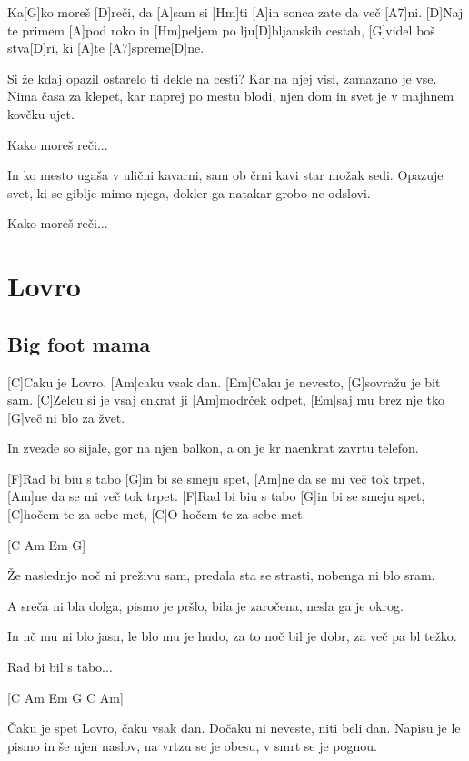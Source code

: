 \documentclass[a4paper,12pt]{article}
\begin{document}
\begin{multicols}{2}
\begin{guitar}
Ka[G]ko moreš [D]reči, da [A]sam si [Hm]ti
[A]in sonca zate da več [A7]ni.
[D]Naj te primem [A]pod roko     
in [Hm]peljem po lju[D]bljanskih cestah,
[G]videl boš stva[D]ri, ki [A]te [A7]spreme[D]ne. 


Si že kdaj opazil 
ostarelo ti dekle na cesti? 
Kar na njej visi, 
zamazano je vse. 
Nima časa za klepet, 
kar naprej po mestu blodi, 
njen dom in svet 
je v majhnem kovčku ujet. 


Kako moreš reči... 


In ko mesto ugaša 
v ulični kavarni, 
sam ob črni kavi 
star možak sedi. 
Opazuje svet, 
ki se giblje mimo njega, 
dokler ga natakar 
grobo ne odslovi. 


Kako moreš reči...

\end{guitar}
\section{Lovro}
\subsection*{Big foot mama}
\begin{guitar}
[C Am Em G] 

[C]Caku je Lovro, [Am]caku vsak dan.
[Em]Caku je nevesto, [G]sovražu je bit sam.
[C]Zeleu si je vsaj enkrat ji [Am]modrček odpet,
[Em]saj mu brez nje tko [G]več ni blo za žvet.


In zvezde so sijale, gor na njen balkon,
a on je kr naenkrat zavrtu telefon.


[F]Rad bi biu s tabo [G]in bi se smeju spet,
[Am]ne da se mi več tok trpet,
[Am]ne da se mi več tok trpet.
[F]Rad bi biu s tabo [G]in bi se smeju spet,
[C]hočem te za sebe met,
[C]O hočem te za sebe met.

[C Am Em G] 

Že naslednjo noč ni preživu sam, 
predala sta se strasti,
nobenga ni blo sram.


A sreča ni bla dolga, pismo je pršlo,
bila je zaročena, nesla ga je okrog.


In nč mu ni blo jasn, 
le blo mu je hudo, 
za to noč bil je dobr, 
za več pa bl težko.


Rad bi bil s tabo...
 
[C Am Em G C Am]

Čaku je spet Lovro, čaku vsak dan.
Dočaku ni neveste, niti beli dan.
Napisu je le pismo in še njen naslov,
na vrtzu se je obesu, v smrt se je pognou. 


\end{guitar}
\end{multicols}
\end{document}
